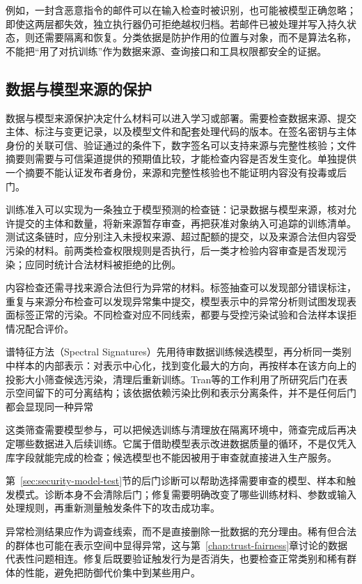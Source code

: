 例如，一封含恶意指令的邮件可以在输入检查时被识别，也可能被模型正确忽略；即使这两层都失效，独立执行器仍可拒绝越权归档。若邮件已被处理并写入持久状态，则还需要隔离和恢复。分类依据是防护作用的位置与对象，而不是算法名称，不能把“用了对抗训练”作为数据来源、查询接口和工具权限都安全的证据。

\subsection{数据与模型来源的保护}
\label{sec:security-training-defense}

数据与模型来源保护决定什么材料可以进入学习或部署。需要检查数据来源、提交主体、标注与变更记录，以及模型文件和配套处理代码的版本。在签名密钥与主体身份的关联可信、验证通过的条件下，数字签名可以支持来源与完整性核验；文件摘要则需要与可信渠道提供的预期值比较，才能检查内容是否发生变化。单独提供一个摘要不能认证发布者身份，来源和完整性核验也不能证明内容没有投毒或后门。

训练准入可以实现为一条独立于模型预测的检查链：记录数据与模型来源，核对允许提交的主体和数量，将新来源暂存审查，再把获准对象纳入可追踪的训练清单。测试这条链时，应分别注入未授权来源、超过配额的提交，以及来源合法但内容受污染的材料。前两类检查权限规则是否执行，后一类才检验内容审查是否发现污染；应同时统计合法材料被拒绝的比例。

内容检查还需寻找来源合法但行为异常的材料。标签抽查可以发现部分错误标注，重复与来源分布检查可以发现异常集中提交，模型表示中的异常分析则试图发现表面标签正常的污染。不同检查对应不同线索，都要与受控污染试验和合法样本误拒情况配合评价。

谱特征方法（Spectral Signatures）先用待审数据训练候选模型，再分析同一类别中样本的内部表示：对表示中心化，找到变化最大的方向，再按样本在该方向上的投影大小筛查候选污染，清理后重新训练。Tran等的工作利用了所研究后门在表示空间留下的可分离结构；该依据依赖污染比例和表示分离条件，并不是任何后门都会显现同一种异常

这类筛查需要模型参与，可以把候选训练与清理放在隔离环境中，筛查完成后再决定哪些数据进入后续训练。它属于借助模型表示改进数据质量的循环，不是仅凭入库字段就能完成的检查；候选模型也不能因被用于审查就直接进入生产服务。

第~\ref{sec:security-model-test}节的后门诊断可以帮助选择需要审查的模型、样本和触发模式。诊断本身不会清除后门；修复需要明确改变了哪些训练材料、参数或输入处理规则，再重新测量触发条件下的攻击成功率。

异常检测结果应作为调查线索，而不是直接删除一批数据的充分理由。稀有但合法的群体也可能在表示空间中显得异常，这与第~\ref{chap:trust-fairness}章讨论的数据代表性问题相连。修复后既要验证触发行为是否消失，也要检查正常类别和稀有群体的性能，避免把防御代价集中到某些用户。

